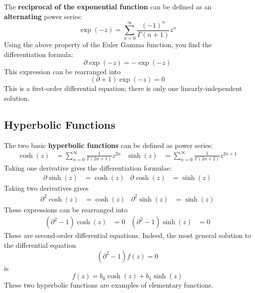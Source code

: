 The \textbf{reciprocal of the exponential function} can be defined as an \textbf{alternating} power series:
\begin{equation}
	\exp({-z}) = \sum_{n = 0}^{\infty} \frac{(-1)^{n}}{\Gamma(n + 1)} z^{n}
\end{equation}
Using the above property of the Euler Gamma function, you find the differentiation formula:
\begin{equation}
	\partial \exp({-z}) = -\exp({-z})
\end{equation}
This expression can be rearranged into
\begin{equation}
	\left( \partial + 1 \right) \exp({-z}) = 0
\end{equation}
This is a first-order differential equation; there is only one linearly-independent solution.
\subsection{Hyperbolic Functions}
The two basic \textbf{hyperbolic functions} can be defined as power series:
\begin{align}
	\cosh(z) & = \sum_{n = 0}^{\infty} \frac{1}{\Gamma(2n + 1)} z^{2n} & \sinh(z) & = \sum_{n = 0}^{\infty} \frac{1}{\Gamma(2n + 2)} z^{2n + 1}
\end{align}
Taking one derivative gives the differentiation formulae:
\begin{align}
	\partial \sinh(z) & = \cosh(z) & \partial \cosh(z) & = \sinh(z)
\end{align}
Taking two derivatives gives
\begin{align}
	\partial^{2} \cosh(z) & = \cosh(z) & \partial^{2} \sinh(z) & = \sinh(z)
\end{align}
These expressions can be rearranged into
\begin{align}
	\left( \partial^{2} - 1 \right) \cosh(z) & = 0 & \left( \partial^{2} - 1 \right) \sinh(z) & = 0
\end{align}
These are second-order differential equations. Indeed, the most general solution to the differential equation
\begin{equation}
	\left( \partial^{2} - 1 \right) f(z) = 0
\end{equation}
is
\begin{equation}
	f(z) = b_{0} \cosh(z) + b_{1} \sinh(z)
\end{equation}
These two hyperbolic functions are examples of elementary functions.
